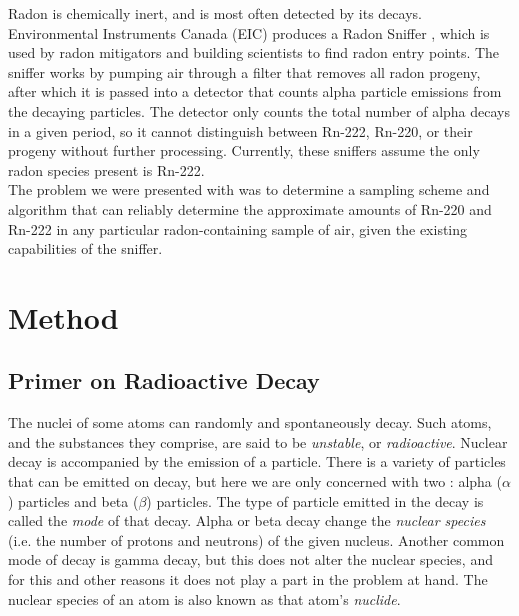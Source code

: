 \documentclass[11pt]{m2pi}
\begin{document}
Radon is chemically inert, and is most often detected by its decays. 
Environmental Instruments Canada (EIC) produces a Radon Sniffer \cite{EIC}, which is used by radon mitigators and building scientists to find radon entry points. The sniffer works by pumping air through a filter that removes all radon progeny, after which it is passed into a detector that counts alpha particle emissions from the decaying particles. The detector only counts the total number of alpha decays in a given period, so it cannot distinguish between Rn-222, Rn-220, or their progeny without further processing. Currently, these sniffers assume the only radon species present is Rn-222. \\

The problem we were presented with was to determine a sampling scheme and algorithm that can reliably determine the approximate amounts of Rn-220 and Rn-222 in any particular radon-containing sample of air, given the existing capabilities of the sniffer.

\section{Method}\label{S:Method}
\subsection{Primer on Radioactive Decay}\label{SS:Primer}
The nuclei of some atoms can randomly and spontaneously decay. %
Such atoms, and the substances they comprise, are said to be \textit{unstable}, or \textit{radioactive}.
Nuclear decay is accompanied by the emission of a particle.
There is a variety of particles that can be emitted on decay, but here we are only concerned with two : alpha ($\alpha$) particles and beta ($\beta$) particles.
The type of particle emitted in the decay is called the \textit{mode} of that decay. 
Alpha or beta decay change the \textit{nuclear species} (i.e. the number of protons and neutrons) of the given nucleus.
Another common mode of decay is gamma decay, but this does not alter the nuclear species, and for this and other reasons it does not play a part in the problem at hand.
The nuclear species of an atom is also known as that atom's \textit{nuclide}.\\
\end{document}
